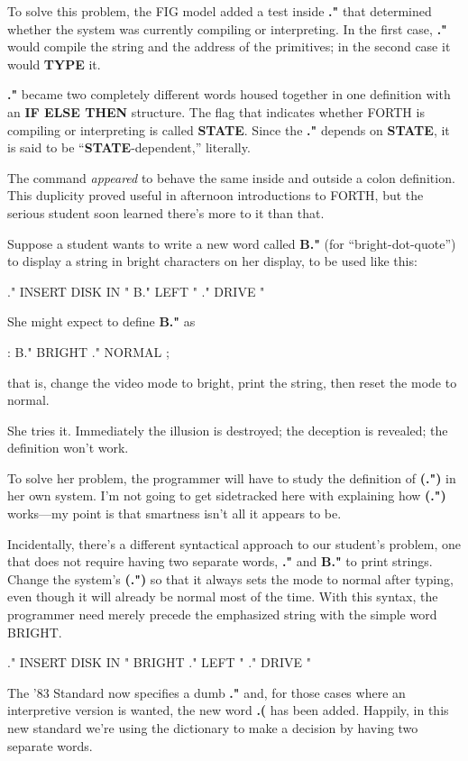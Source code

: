 To solve this problem, the FIG model added a test inside \textbf{."} that
determined whether the system was currently compiling or interpreting.
In the first case, \textbf{."} would compile the string and the address of the
primitives; in the second case it would \textbf{TYPE} it.

\textbf{."} became two completely different words housed together in one
definition with an \textbf{IF ELSE THEN} structure. The flag that indicates
whether FORTH is compiling or interpreting is called \textbf{STATE}. Since the
\textbf{."} depends on \textbf{STATE}, it is said to be ``\textbf{STATE}-dependent,''
literally.

The command \emph{appeared} to behave the same inside and outside a
colon definition. This duplicity proved useful in afternoon introductions
to FORTH, but the serious student soon learned there's more to it than
that.

Suppose a student wants to write a new word called \textbf{B."} (for
``bright-dot-quote'') to display a string in bright characters on her
display, to be used like this:

\begin{Code}
." INSERT DISK IN "  B." LEFT "  ." DRIVE "
\end{Code}
She might expect to define \textbf{B."} as

\begin{Code}
: B."   BRIGHT  ."  NORMAL ;
\end{Code}
that is, change the video mode to bright, print the string, then reset the
mode to normal.

She tries it. Immediately the illusion is destroyed; the deception is
revealed; the definition won't work.

To solve her problem, the programmer will have to study the definition
of \textbf{(.")} in her own system. I'm not going to get sidetracked here with
explaining how \textbf{(.")} works---my point is that smartness isn't all it
appears to be.

Incidentally, there's a different syntactical approach to our
student's problem, one that does not require having two separate words,
\textbf{."} and \textbf{B."} to print strings. Change the system's \textbf{(.")} so
that it always sets the mode to normal after typing, even though it will
already be normal most of the time. With this syntax, the programmer
need merely precede the emphasized string with the simple word BRIGHT.

\begin{Code}
." INSERT DISK IN "  BRIGHT ." LEFT "  ." DRIVE "
\end{Code}
The '83 Standard now specifies a dumb \textbf{."} and, for those cases where an
interpretive version is wanted, the new word \textbf{.(} has been added. Happily,
in this new standard we're using the dictionary to make a decision by
having two separate words.


